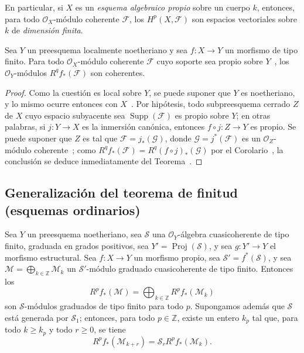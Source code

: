 En particular, si $X$ es un \emph{esquema algebraico propio} sobre un cuerpo $k$, entonces, para todo $\mathcal O_X$-módulo coherente $\mathcal F$, los $H^p(X,\mathcal F)$ son espacios vectoriales sobre $k$ de \emph{dimensión finita}.

\begin{corollary}[3.2.4]
\label{III.3.2.4}
\label{III.3.2.4-fr}
Sea $Y$ un preesquema localmente noetheriano y sea $f:X\to Y$ un morfismo de tipo finito.
Para todo $\mathcal O_X$-módulo coherente $\mathcal F$ cuyo soporte sea propio sobre $Y$~, los $\mathcal O_Y$-módulos $R^qf_*(\mathcal F)$ son coherentes.
\end{corollary}

\begin{proof}
Como la cuestión es local sobre $Y$, se puede suponer que $Y$ es noetheriano, y lo mismo ocurre entonces con $X$~.
Por hipótesis, todo subpreesquema cerrado $Z$ de $X$ cuyo espacio subyacente sea $\operatorname{Supp}(\mathcal F)$ es propio sobre $Y$; en otras palabras, si $j:Y\to X$ es la inmersión canónica, entonces $f\circ j:Z\to Y$ es propio.
Se puede suponer que $Z$ es tal que $\mathcal F=j_*(\mathcal G)$, donde $\mathcal G=j^*(\mathcal F)$ es un $\mathcal O_Z$-módulo coherente~; como $R^qf_*(\mathcal F)=R^q(f\circ j)_*(\mathcal G)$ por el Corolario~, la conclusión se deduce inmediatamente del Teorema~.
\end{proof}

\subsection{Generalización del teorema de finitud (esquemas ordinarios)}
\label{subsection:III.3.3}
\label{subsection:III.3.3-fr}

\begin{proposition}[3.3.1]
\label{III.3.3.1}
\label{III.3.3.1-fr}
Sea $Y$ un preesquema noetheriano, sea $\mathcal S$ una $\mathcal O_Y$-álgebra cuasicoherente de tipo finito, graduada en grados positivos, sea $Y'=\operatorname{Proj}(\mathcal S)$, y sea $g:Y'\to Y$ el morfismo estructural.
Sea $f:X\to Y$ un morfismo propio, sea $\mathcal S'=f^*(\mathcal S)$, y sea $\mathcal M=\bigoplus_{k\in\mathbb Z}\mathcal M_k$ un $\mathcal S'$-módulo graduado cuasicoherente de tipo finito.
Entonces los \[
R^pf_*(\mathcal M)=\bigoplus_{k\in\mathbb Z}R^pf_*(\mathcal M_k)
\] son $\mathcal S$-módulos graduados de tipo finito para todo $p$.
Supongamos además que $\mathcal S$ está generada por $\mathcal S_1$; entonces, para todo $p\in\mathbb Z$, existe un entero $k_p$ tal que, para todo $k\geq k_p$ y todo $r\geq0$, se tiene
\[
R^pf_*(\mathcal M_{k+r})=\mathcal S_rR^pf_*(\mathcal M_k).
\tag{3.3.1.1}\label{III.3.3.1.1-fr}
\] 
\end{proposition}

